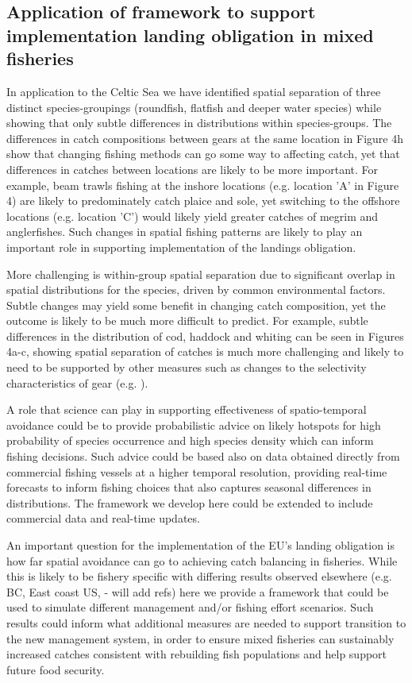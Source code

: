 \documentclass{nature}
\begin{document}
\begin{linenumbers}
\subsection{Application of framework to support implementation landing
	obligation in mixed fisheries} In application to the Celtic Sea we have
identified spatial separation of three distinct species-groupings (roundfish,
flatfish and deeper water species) while showing that only subtle differences
in distributions within species-groups. The differences in catch compositions
between gears at the same location in Figure 4h show that changing fishing
methods can go some way to affecting catch, yet that differences in catches
between locations are likely to be more important. For example, beam trawls
fishing at the inshore locations (e.g. location 'A' in Figure 4) are likely to
predominately catch plaice and sole, yet switching to the offshore locations
(e.g. location 'C') would likely yield greater catches of megrim and
anglerfishes.  Such changes in spatial fishing patterns are likely to play an
important role in supporting implementation of the landings obligation.

More challenging is within-group spatial separation due to significant overlap
in spatial distributions for the species, driven by common environmental
factors. Subtle changes may yield some benefit in changing catch composition,
yet the outcome is likely to be much more difficult to predict. For example,
subtle differences in the distribution of cod, haddock and whiting can be seen
in Figures 4a-c, showing spatial separation of catches is much more challenging
and likely to need to be supported by other measures such as changes to the
selectivity characteristics of gear (e.g. \cite{Santos2016}). 

A role that science can play in supporting effectiveness of spatio-temporal
avoidance could be to provide probabilistic advice on likely hotspots for high
probability of species occurrence and high species density which can inform
fishing decisions. Such advice could be based also on data obtained directly
from commercial fishing vessels at a higher temporal resolution, providing
real-time forecasts to inform fishing choices that also captures seasonal
differences in distributions. The framework we develop here could be extended
to include commercial data and real-time updates.

An important question for the implementation of the EU's landing obligation is
how far spatial avoidance can go to achieving catch balancing in fisheries.
While this is likely to be fishery specific with differing results observed
elsewhere (e.g. BC, East coast US, - will add refs) here we provide a framework
that could be used to simulate different management and/or fishing effort
scenarios. Such results could inform what additional measures are needed to
support transition to the new management system, in order to ensure mixed
fisheries can sustainably increased catches consistent with rebuilding fish
populations and help support future food security.


\end{linenumbers}
\end{document}
